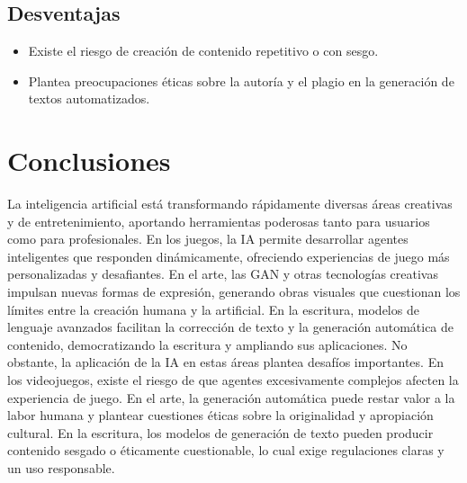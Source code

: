 \documentclass[12pt]{article}
\begin{document}
\subsection{Desventajas}
\begin{itemize}
    \item Existe el riesgo de creación de contenido repetitivo o con sesgo.
    \item Plantea preocupaciones éticas sobre la autoría y el plagio en la generación de textos automatizados.
\end{itemize}

\section{Conclusiones}

La inteligencia artificial está transformando rápidamente diversas áreas creativas y de entretenimiento, 
aportando herramientas poderosas tanto para usuarios como para profesionales. En los juegos, la IA permite desarrollar agentes 
inteligentes que responden dinámicamente, ofreciendo experiencias de juego más personalizadas y desafiantes. En el arte, las GAN y
otras tecnologías creativas impulsan nuevas formas de expresión, generando obras visuales que cuestionan los límites entre la creación humana
y la artificial. En la escritura, modelos de lenguaje avanzados facilitan la corrección de texto y la generación automática de contenido, 
democratizando la escritura y ampliando sus aplicaciones.
No obstante, la aplicación de la IA en estas áreas plantea desafíos importantes. En los videojuegos, existe el riesgo de que agentes 
excesivamente complejos afecten la experiencia de juego. En el arte, la generación automática puede restar valor a la labor humana y 
plantear cuestiones éticas sobre la originalidad y apropiación cultural. En la escritura, los modelos de generación de texto pueden 
producir contenido sesgado o éticamente cuestionable, lo cual exige regulaciones claras y un uso responsable.

\clearpage
\end{document}
